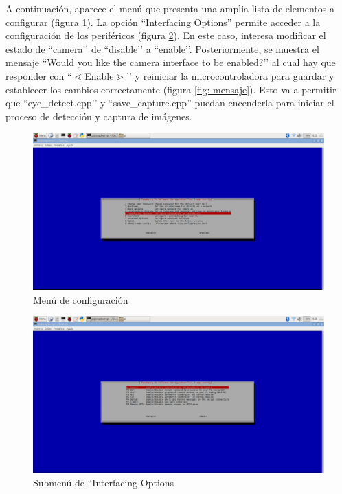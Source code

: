     
A continuación, aparece el menú que presenta una amplia lista de elementos a configurar (figura \ref{fig: menu}). La opción ``Interfacing Options'' permite acceder a la configuración de los periféricos (figura \ref{fig: submenu}). 
En este caso, interesa modificar el estado de ``camera’’ de ``disable’’ a ``enable’’. Posteriormente, se muestra el mensaje ``Would you like the camera interface to be enabled?’’ al cual hay que responder con ``$\lessdot$Enable$\gtrdot$’’ y reiniciar la microcontroladora para guardar y establecer los cambios correctamente (figura \ref{fig: mensaje}). Esto va a permitir que ``eye\_detect.cpp’’ y ``save\_capture.cpp'' puedan encenderla para iniciar el proceso de detección y captura de imágenes.

    \begin{figure}[H]
    \centering
    \includegraphics[scale = 0.25]{capitulo_04/figuras_dir/actp1.jpg}
    \caption{Menú de configuración}
    \label{fig: menu}
    \end{figure}
    
\clearpage
        \begin{figure}
    \centering
    \includegraphics[scale = 0.25]{capitulo_04/figuras_dir/actp2.jpg}
    \caption{Submenú de ``Interfacing Options}
    \label{fig: submenu}
    \end{figure}
    


